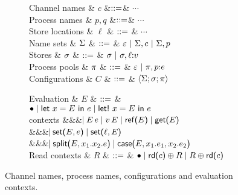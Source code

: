 \begin{figure*}[t]
\centering
\begin{subfigure}{0.35\textwidth}
\begin{grammar}
  Channel names & $c$   &$\mathrel{::=}$& $\cdots$
  \\
  Process names & $p,q$ &$\mathrel{::=}$& $\cdots$
  \\
  Store locations & $\ell$ & $\mathrel{::=}$ & $\cdots$
  \\[1mm]
  Name sets
  & $\Sigma$ 
    & $\mathrel{::=}$ & $\varepsilon ~|~ \Sigma, c ~|~ \Sigma, p$
  \\
  Stores & $\sigma$ & $\mathrel{::=}$ & $\sigma ~|~ \sigma, \ell{:}v$
  \\
  Process pools
  & $\pi$ 
    & $\mathrel{::=}$ & $\varepsilon ~|~ \pi, p{:}e$
    \\[1mm]
  Configurations
  & $C$
     & $\mathrel{::=}$ & $\left<\Sigma;\sigma;\pi\right> $
     \\[1mm]
\end{grammar}
\end{subfigure}%
\begin{subfigure}{0.5\textwidth}
\begin{grammar}
 Evaluation
  & $E$
     & $\mathrel{::=}$ & 
 $\bullet \mathrel{\mid} \text{\textsf{let}}\ {x} = {E}\ \text{\textsf{in}}\ {e} \mathrel{\mid} \text{\textsf{let!}}\ {x} = {E}\ \text{\textsf{in}}\ {e}$
\\ contexts &&& $\hspace{-1.02ex}\mathrel{\mid} E\,e \mathrel{\mid} v\,E \mathrel{\mid} \text{\textsf{ref}}\textsf{(}{E}\textsf{)} \mathrel{\mid} \text{\textsf{get}}\textsf{(}{E}\textsf{)}$
     \\ &&& $\hspace{-1.02ex}\mathrel{\mid} \text{\textsf{set}}\textsf{(}{E},{e}\textsf{)} \mathrel{\mid} \text{\textsf{set}}\textsf{(}{\ell},{E}\textsf{)}$
\\ &&& $\hspace{-1.02ex}\mathrel{\mid} \text{\textsf{split}}\textsf{(}{E},{x_1}.{x_2}.{e}\textsf{)} \mathrel{\mid} \text{\textsf{case}}\textsf{(}{E},{x_1}.{e_1},{x_2}.{e_2}\textsf{)}$
\\[1mm]
 Read contexts
  & $R$
     & $\mathrel{::=}$ & $\bullet \mathrel{\mid} \text{\textsf{rd}}\textsf{(}{c}\textsf{)} \oplus R \mathrel{\mid} R \oplus \text{\textsf{rd}}\textsf{(}{c}\textsf{)}$
\end{grammar}
\end{subfigure}
\caption{Channel names, process names, configurations and evaluation contexts.}
\label{fig:configs}
\end{figure*}

